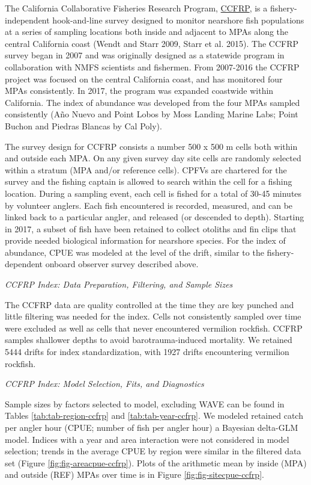 \documentclass[11pt,
  english,
]{article}
\begin{document}
The California Collaborative Fisheries Research Program, {\href{https://www.mlml.calstate.edu/ccfrp/}{CCFRP}\leavevmode\tagmcend\tagstructend}, is a fishery-independent hook-and-line survey designed to monitor nearshore fish populations at a series of sampling locations both inside and adjacent to MPAs along the central California coast {(Wendt and Starr 2009, Starr et al. 2015)\leavevmode\tagmcend\tagstructend}. The CCFRP survey began in 2007 and was originally designed as a statewide program in collaboration with NMFS scientists and fishermen. From 2007-2016 the CCFRP project was focused on the central California coast, and has monitored four MPAs consistently. In 2017, the program was expanded coastwide within California. The index of abundance was developed from the four MPAs sampled consistently (Año Nuevo and Point Lobos by Moss Landing Marine Labs; Point Buchon and Piedras Blancas by Cal Poly).

The survey design for CCFRP consists a number 500 x 500 m cells both within and outside each MPA. On any given survey day site cells are randomly selected within a stratum (MPA and/or reference cells). CPFVs are chartered for the survey and the fishing captain is allowed to search within the cell for a fishing location. During a sampling event, each cell is fished for a total of 30-45 minutes by volunteer anglers. Each fish encountered is recorded, measured, and can be linked back to a particular angler, and released (or descended to depth). Starting in 2017, a subset of fish have been retained to collect otoliths and fin clips that provide needed biological information for nearshore species. For the index of abundance, CPUE was modeled at the level of the drift, similar to the fishery-dependent onboard observer survey described above.

\emph{CCFRP Index: Data Preparation, Filtering, and Sample Sizes}

The CCFRP data are quality controlled at the time they are key punched and little filtering was needed for the index. Cells not consistently sampled over time were excluded as well as cells that never encountered vermilion rockfish. CCFRP samples shallower depths to avoid barotrauma-induced mortality. We retained 5444 drifts for index standardization, with 1927 drifts encountering vermilion rockfish.

\emph{CCFRP Index: Model Selection, Fits, and Diagnostics}

Sample sizes by factors selected to model, excluding WAVE can be found in Tables \ref{tab:tab-region-ccfrp} and \ref{tab:tab-year-ccfrp}. We modeled retained catch per angler hour (CPUE; number of fish per angler hour) a Bayesian delta-GLM model. Indices with a year and area interaction were not considered in model selection; trends in the average CPUE by region were similar in the filtered data set (Figure \ref{fig:fig-areacpue-ccfrp}). Plots of the arithmetic mean by inside (MPA) and outside (REF) MPAs over time is in Figure \ref{fig:fig-sitecpue-ccfrp}.
\end{document}
